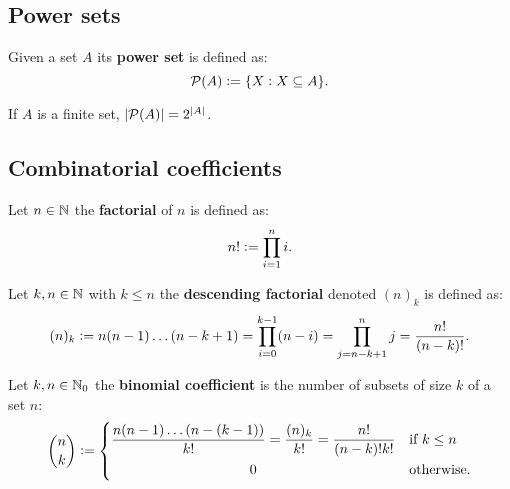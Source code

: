 \documentclass[../Year1/Year1.tex]{subfiles}
\begin{document}
\subsection{Power sets}
\begingroup\belowdisplayskip=-10pt
    \begin{definition}
        Given a set $A$ its \textbf{power set} is defined as:
        \[
            \mathcal{P}(A) := \{X:X\subseteq A\}\textcolor{black}{.}
        \]
    \end{definition}
\endgroup

\begin{theorem}
    If $A$ is a finite set, $|\mathcal{P}(A)|=2^{|A|}$.
\end{theorem}

\subsection{Combinatorial coefficients}

\begingroup\belowdisplayskip=-0pt
    \begin{definition}[Factorial]
        Let $n\in\mathbb{N}$ the \textbf{factorial} of $n$ is defined as:
        \[
        n! := \prod_{i=1}^ni\textcolor{black}{.}
        \]
    \end{definition}
\endgroup

\begingroup\belowdisplayskip=-10pt
    \begin{definition}
        Let $k,n\in\mathbb{N}$ with $k\leq n$ the \textbf{descending factorial} denoted $(n)_k$ is defined as:
        \[
        (n)_k := n(n-1)\ldots(n-k+1) = \prod_{i=0}^{k-1}(n-i) = \prod_{j=n-k+1}^{n}j = \frac{n!}{(n-k)!}\textcolor{black}{.}
        \]
    \end{definition}
\endgroup

\begingroup\belowdisplayskip=-10pt
    \begin{definition}
        Let $k,n\in\mathbb{N}_0$ the \textbf{binomial coefficient} is the number of subsets of size $k$ of a set $n$:
        \[ 
            \binom{n}{k} := 
            \begin{dcases}
            \frac{n(n-1)\ldots(n-(k-1))}{k!} = \frac{(n)_k}{k!} = \frac{n!}{(n-k)!k!} & \textcolor{black}{\text{if }} k\leq n \\
            \omit\hfil0\hfil & \textcolor{black}{\text{otherwise.}}
            \end{dcases}
        \]
    \end{definition}
\endgroup

\end{document}
